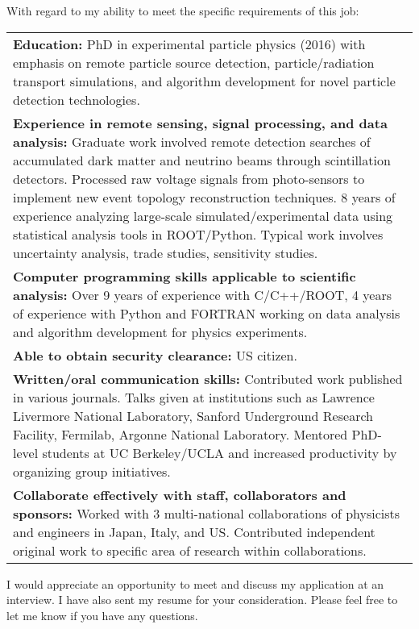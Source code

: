\documentclass[11pt]{moderncv}        %
\begin{document}
With regard to my ability to meet the specific requirements of this job:\\
\noindent\begin{tabularx}{\linewidth}{@{{}\textbullet\enskip}X@{\quad}@{}}
	\textbf{Education:} PhD in experimental particle physics (2016) with
	emphasis on remote particle source detection, particle/radiation transport
	simulations, and algorithm development for novel particle detection
	technologies.\\
	\textbf{Experience in remote sensing, signal processing, and data
	analysis:} Graduate work involved remote detection searches of accumulated
	dark matter and neutrino beams through scintillation detectors. Processed
	raw voltage signals from photo-sensors to implement new event topology
	reconstruction techniques. 8 years of experience analyzing large-scale
	simulated/experimental data using statistical analysis tools in
	ROOT/Python. Typical work involves uncertainty analysis, trade studies,
	sensitivity studies.\\
	\textbf{Computer programming skills applicable to scientific analysis:}
	Over 9 years of experience with C/C++/ROOT, 4 years of experience with
	Python and FORTRAN working on data analysis and algorithm development for
	physics experiments.\\
	\textbf{Able to obtain security clearance:} US citizen.\\
	\textbf{Written/oral communication skills:} Contributed work published
	in various journals. Talks given at institutions such as Lawrence Livermore
	National Laboratory, Sanford Underground Research Facility, Fermilab,
	Argonne National Laboratory. Mentored PhD-level students at UC
	Berkeley/UCLA and increased productivity by organizing group initiatives.\\
	\textbf{Collaborate effectively with staff, collaborators and sponsors:}
	Worked with 3 multi-national collaborations of physicists and engineers in
	Japan, Italy, and US. Contributed independent original work to specific
	area of research within collaborations.\\
\end{tabularx}

I would appreciate an opportunity to meet and discuss my application at an
interview. I have also sent my resume for your consideration. Please feel free
to let me know if you have any questions.

\makeletterclosing
\end{document}
